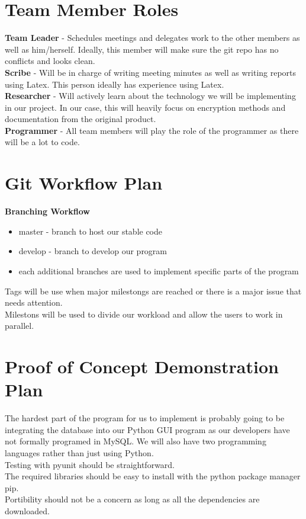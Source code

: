\documentclass{article}
\begin{document}
\section{Team Member Roles}

\textbf{Team Leader} - Schedules meetings and delegates work to the other members as well as him/herself. Ideally, this member will make sure the git repo has no conflicts and looks clean.\\
\textbf{Scribe} - Will be in charge of writing meeting minutes as well as writing reports using Latex. This person ideally has experience using Latex.\\
\textbf{Researcher} - Will actively learn about the technology we will be implementing in our project. In our case, this will heavily focus on encryption methods and documentation from the original product.\\
\textbf{Programmer} - All team members will play the role of the programmer as there will be a lot to code.\\

\section{Git Workflow Plan}

\textbf{Branching Workflow}
\begin{itemize}
    \item master - branch to host our stable code
    \item develop - branch to develop our program
    \item each additional branches are used to implement specific parts of the program
\end{itemize}
Tags will be use when major milestongs are reached or there is a major issue that needs attention.\\
Milestons will be used to divide our workload and allow the users to work in parallel.

\section{Proof of Concept Demonstration Plan}

The hardest part of the program for us to implement is probably going to be integrating the database into our Python GUI program as our developers have not formally programed in MySQL. We will also have two programming languages rather than just using Python.\\
Testing with pyunit should be straightforward.\\
The required libraries should be easy to install with the python package manager pip.\\
Portibility should not be a concern as long as all the dependencies are downloaded.
\end{document}
